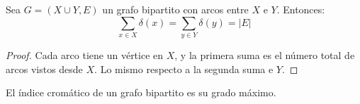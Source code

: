   \begin{lemma}
    \label{lem:bipartito-grados}
    Sea \(G = (X \cup Y, E)\) un grafo bipartito
    con arcos entre \(X\) e \(Y\).
    Entonces:
    \begin{equation*}
      \sum_{x \in X} \delta(x) = \sum_{y \in Y} \delta(y)
	= \lvert E\rvert
    \end{equation*}
  \end{lemma}
  \begin{proof}
    Cada arco tiene un vértice en \(X\),
    y la primera suma
    es el número total de arcos vistos desde \(X\).
    Lo mismo respecto a la segunda suma e \(Y\).
  \end{proof}

  \begin{theorem}
    \label{theo:bipartito-cromatico}
    El índice cromático de un grafo bipartito%
    es su grado máximo.
  \end{theorem}
